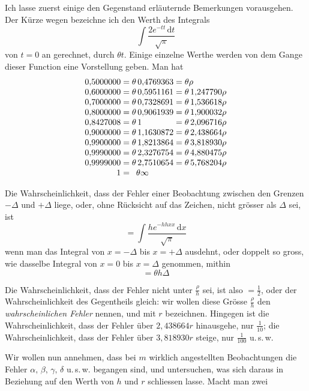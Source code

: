 Ich lasse zuerst einige den Gegenstand erläuternde Bemerkungen vorausgehen. Der Kürze wegen bezeichne ich den Werth des Integrals
\[
\int\frac{2e^{-tt}\,\mathrm{d}t}{\surd\pi}
\]
von \(t=0\) an gerechnet, durch \(\theta t\). Einige einzelne Werthe werden von dem Gange dieser Function eine Vorstellung geben. Man hat
\[
\begin{array}{r@{\;=\;}l@{\;=\;}l}
0{,}5000000&\theta\,0{,}4769363&\theta\rho\\
0{,}6000000&\theta\,0{,}5951161&\theta\,1{,}247790\rho\\
0{,}7000000&\theta\,0{,}7328691&\theta\,1{,}536618\rho\\
0{,}8000000&\theta\,0{,}9061939&\theta\,1{,}900032\rho\\
0{,}8427008&\theta\,1&\theta\,2{,}096716\rho\\
0{,}9000000&\theta\,1{,}1630872&\theta\,2{,}438664\rho\\
0{,}9900000&\theta\,1{,}8213864&\theta\,3{,}818930\rho\\
0{,}9990000&\theta\,2{,}3276754&\theta\,4{,}880475\rho\\
0{,}9999000&\theta\,2{,}7510654&\theta\,5{,}768204\rho\\
1&\multicolumn{2}{l}{\theta\infty}
\end{array}
\]

Die Wahrscheinlichkeit, dass der Fehler einer Beobachtung zwischen den Grenzen \(-\Delta\) und \(+\Delta\) liege, oder, ohne Rücksicht auf das Zeichen, nicht grösser als \(\Delta\) sei, ist
\[
=\int\frac{he^{-hhxx}\,\mathrm{d}x}{\surd\pi}
\]
wenn man das Integral von \(x=-\Delta\) bis \(x=+\Delta\) ausdehnt, oder doppelt so gross, wie dasselbe Integral von \(x=0\) bis \(x=\Delta\) genommen, mithin
\[
=\theta h\Delta
\]

Die Wahrscheinlichkeit, dass der Fehler nicht unter \(\frac\rho h\) sei, ist also \(=\frac12\), oder der Wahrscheinlichkeit des Gegentheils gleich: wir wollen diese Grösse \(\frac\rho h\) den \textit{wahrscheinlichen Fehler} nennen, und mit \(r\) bezeichnen. Hingegen ist die Wahrscheinlichkeit, dass der Fehler über \(2{,}438664r\) hinausgehe, nur \(\frac1{10}\); die Wahrscheinlichkeit, dass der Fehler über \(3{,}818930r\) steige, nur \(\frac1{100}\) u.\,s.\,w.

Wir wollen nun annehmen, dass bei \(m\) wirklich angestellten Beobachtungen die Fehler \(\alpha,\,\beta,\,\gamma,\,\delta\) u.\,s.\,w. begangen sind, und untersuchen, was sich daraus in Beziehung auf den Werth von \(h\) und \(r\) schliessen lasse. Macht man zwei
